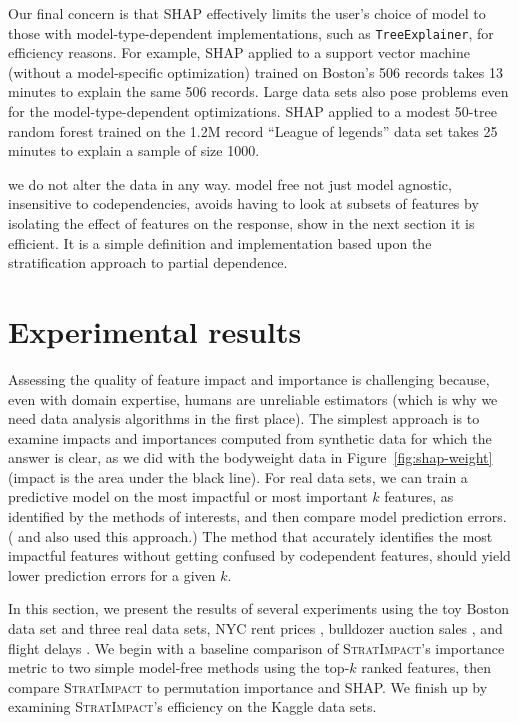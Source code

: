 \documentclass[11pt]{article}
\newcommand{\figref}[1]{Figure~\ref{#1}}
\newcommand{\todo}[1]{{{\small\color{red}{[#1]}}}}
\newcommand{\simp}{\fontfamily{cmr}\textsc{\small StratImpact}}
\begin{document}
Our final concern is that SHAP effectively limits the user's choice of model to those with model-type-dependent implementations, such as {\tt\small TreeExplainer}, for efficiency reasons. For example, SHAP applied to a support vector machine (without a model-specific optimization) trained on Boston's 506 records takes 13 minutes to explain the same 506 records.  Large data sets also pose problems even for the model-type-dependent optimizations. SHAP applied to a modest 50-tree random forest trained on the 1.2M record ``League of legends'' data set \citep{lol} takes 25 minutes to explain a sample of size 1000.


\todo{Summarize our benefits.} we do not alter the data in any way. model free not just model agnostic, insensitive to codependencies, avoids having to look at subsets of features by isolating the effect of features on the response, show in the next section it is efficient. It is a simple definition and implementation based upon the stratification approach to partial dependence. 

\section{Experimental results}\label{sec:experiments}

Assessing the quality of feature impact and importance is challenging because, even with domain expertise, humans are unreliable estimators (which is why we need data analysis algorithms in the first place).  The simplest approach is to examine impacts and importances computed from synthetic data for which the answer is clear, as we did with the bodyweight data in \figref{fig:shap-weight} (impact is the area under the black line).  For real data sets, we can train a predictive model on the most impactful or most important $k$ features, as identified by the methods of interests, and then compare model prediction errors. (\citealt{mRMR} and \citealt{tsanas} also used this approach.) The method that accurately identifies the most impactful features without getting confused by codependent features, should yield lower prediction errors for a given $k$. 

In this section, we present the results of several experiments using the toy Boston data set and three real data sets, NYC rent prices \citep{rent}, bulldozer auction sales \citep{bulldozer}, and flight delays \citep{flights}. We begin with a baseline comparison of \simp{}'s importance metric to two simple model-free methods using the top-$k$ ranked features, then compare \simp{} to permutation importance and SHAP. We finish up by examining \simp's efficiency on the Kaggle data sets.
\end{document}

